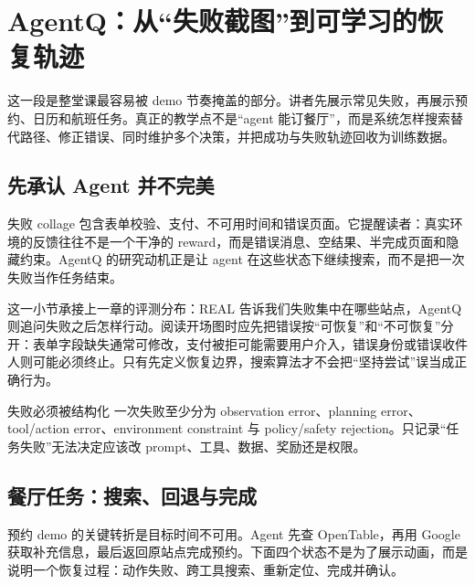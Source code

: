\section{AgentQ：从“失败截图”到可学习的恢复轨迹}

这一段是整堂课最容易被 demo 节奏掩盖的部分。讲者先展示常见失败，再展示预约、日历和航班任务。真正的教学点不是“agent 能订餐厅”，而是系统怎样搜索替代路径、修正错误、同时维护多个决策，并把成功与失败轨迹回收为训练数据。

\subsection{先承认 Agent 并不完美}

失败 collage 包含表单校验、支付、不可用时间和错误页面。它提醒读者：真实环境的反馈往往不是一个干净的 reward，而是错误消息、空结果、半完成页面和隐藏约束。AgentQ 的研究动机正是让 agent 在这些状态下继续搜索，而不是把一次失败当作任务结束。

这一小节承接上一章的评测分布：REAL 告诉我们失败集中在哪些站点，AgentQ 则追问失败之后怎样行动。阅读开场图时应先把错误按“可恢复”和“不可恢复”分开：表单字段缺失通常可修改，支付被拒可能需要用户介入，错误身份或错误收件人则可能必须终止。只有先定义恢复边界，搜索算法才不会把“坚持尝试”误当成正确行为。



\begin{importantbox}{失败必须被结构化}
一次失败至少分为 observation error、planning error、tool/action error、environment constraint 与 policy/safety rejection。只记录“任务失败”无法决定应该改 prompt、工具、数据、奖励还是权限。
\end{importantbox}

\subsection{餐厅任务：搜索、回退与完成}

预约 demo 的关键转折是目标时间不可用。Agent 先查 OpenTable，再用 Google 获取补充信息，最后返回原站点完成预约。下面四个状态不是为了展示动画，而是说明一个恢复过程：动作失败、跨工具搜索、重新定位、完成并确认。


